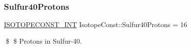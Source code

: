 \subsubsection{\texorpdfstring{Sulfur40\+Protons}{Sulfur40Protons}}
{\footnotesize\ttfamily \mbox{\hyperlink{group___isotope_const-_macros_ga5f18360b3e99483a35c32d789e62621c}{I\+S\+O\+T\+O\+P\+E\+C\+O\+N\+S\+T\+\_\+\+I\+NT}} Isotope\+Const\+::\+Sulfur40\+Protons = 16}

\$ \$ Protons in Sulfur-\/40. 